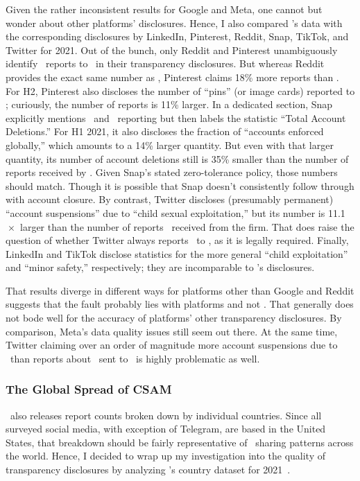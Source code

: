 Given the rather inconsistent results for Google and Meta, one cannot but wonder
about other platforms' disclosures. Hence, I also compared \NCMEC's data with
the corresponding disclosures by LinkedIn, Pinterest, Reddit, Snap, TikTok, and
Twitter for 2021. Out of the bunch, only Reddit and Pinterest unambiguously
identify \CSAM\ reports to \NCMEC\ in their transparency disclosures. But
whereas Reddit provides the exact same number as \NCMEC, Pinterest claims 18\%
more reports than \NCMEC. For H2, Pinterest also discloses the number of
``pins'' (or image cards) reported to \NCMEC; curiously, the number of reports
is 11\% larger. In a dedicated section, Snap explicitly mentions \CSAM\ and
\NCMEC\ reporting but then labels the statistic ``Total Account Deletions.'' For
H1 2021, it also discloses the fraction of ``accounts enforced globally,'' which
amounts to a 14\% larger quantity. But even with that larger quantity, its
number of account deletions still is 35\% smaller than the number of reports
received by \NCMEC. Given Snap's stated zero-tolerance policy, those numbers
should match. Though it is possible that Snap doesn't consistently follow
through with account closure. By contrast, Twitter discloses (presumably
permanent) ``account suspensions'' due to ``child sexual exploitation,'' but its
number is 11.1$\mspace{1mu}\times$ larger than the number of reports \NCMEC\
received from the firm. That does raise the question of whether Twitter always
reports \CSAM\ to \NCMEC, as it is legally required. Finally, LinkedIn and
TikTok disclose statistics for the more general ``child exploitation'' and
``minor safety,'' respectively; they are incomparable to \NCMEC's disclosures.

That results diverge in different ways for platforms other than Google and
Reddit suggests that the fault probably lies with platforms and not \NCMEC. That
generally does not bode well for the accuracy of platforms' other transparency
disclosures. By comparison, Meta's data quality issues still seem out there. At
the same time, Twitter claiming over an order of magnitude more account
suspensions due to \CSAM\ than reports about \CSAM\ sent to \NCMEC\ is highly
problematic as well.


\subsubsection{The Global Spread of CSAM}

\NCMEC\ also releases report counts broken down by individual countries. Since
all surveyed social media, with exception of Telegram, are based in the United
States, that breakdown should be fairly representative of \CSAM\ sharing
patterns across the world. Hence, I decided to wrap up my investigation into the
quality of transparency disclosures by analyzing \NCMEC's country dataset for
2021~\cite{NcmecByCountry2021}.

